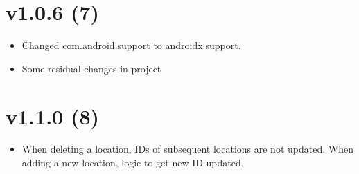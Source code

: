 \documentclass{article}
\begin{document}
    \section{v1.0.6 (7)}\label{sec:7}
    \begin{itemize}
        \item Changed com.android.support to androidx.support.
        \item Some residual changes in project
    \end{itemize}


    \section{v1.1.0 (8)}\label{sec:8}
    \begin{itemize}
        \item When deleting a location, IDs of subsequent locations are not updated.
        When adding a new location, logic to get new ID updated.
    \end{itemize}
\end{document}
